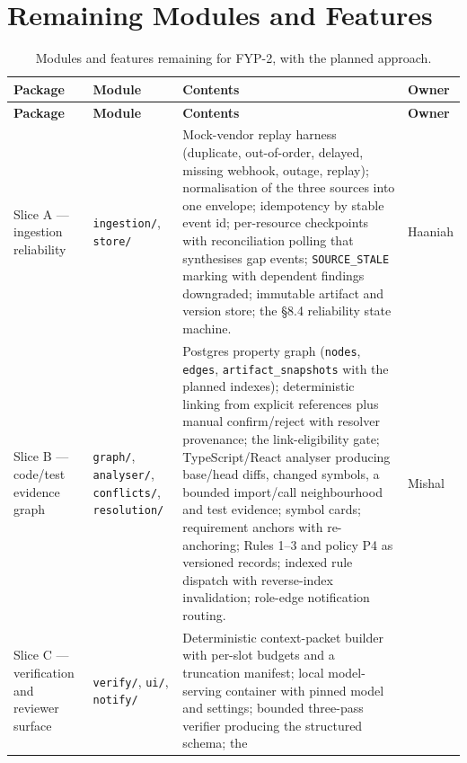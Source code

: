 \section{Remaining Modules and Features}
\label{sec:remaining-modules}

\begin{longtable}{>{\raggedright\arraybackslash}p{} >{\raggedright\arraybackslash}p{} >{\raggedright\arraybackslash}p{} >{\raggedright\arraybackslash}p{}}
\caption{Modules and features remaining for FYP-2, with the planned approach.}\label{tab:remaining-modules}\\
\hline\textbf{Package} & \textbf{Module} & \textbf{Contents} & \textbf{Owner} \\
\hline\endfirsthead
\hline\textbf{Package} & \textbf{Module} & \textbf{Contents} & \textbf{Owner} \\
\hline\endhead
Slice A --- ingestion reliability & \texttt{ingestion/}, \texttt{store/} &
  Mock-vendor replay harness (duplicate, out-of-order, delayed, missing
  webhook, outage, replay); normalisation of the three sources into one
  envelope; idempotency by stable event id; per-resource checkpoints with
  reconciliation polling that synthesises gap events; \texttt{SOURCE\_STALE}
  marking with dependent findings downgraded; immutable artifact and version
  store; the \S{}8.4 reliability state machine.
  & Haaniah \\
Slice B --- code/test evidence graph & \texttt{graph/}, \texttt{analyser/},
  \texttt{conflicts/}, \texttt{resolution/} &
  Postgres property graph (\texttt{nodes}, \texttt{edges},
  \texttt{artifact\_snapshots} with the planned indexes); deterministic linking
  from explicit references plus manual confirm/reject with resolver provenance;
  the link-eligibility gate; TypeScript/React analyser producing base/head diffs,
  changed symbols, a bounded import/call neighbourhood and test evidence;
  symbol cards; requirement anchors with re-anchoring; Rules 1--3 and policy P4
  as versioned records; indexed rule dispatch with reverse-index invalidation;
  role-edge notification routing.
  & Mishal \\
Slice C --- verification and reviewer surface & \texttt{verify/}, \texttt{ui/},
  \texttt{notify/} &
  Deterministic context-packet builder with per-slot budgets and a truncation
  manifest; local model-serving container with pinned model and settings;
  bounded three-pass verifier producing the structured schema; the

\end{longtable}

